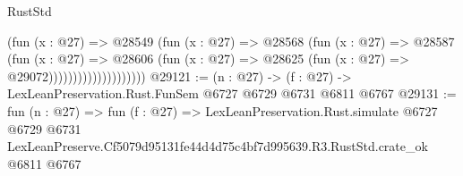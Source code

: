 \begin{lexlean}{RustStd}
\begin{coremodule}
                                (fun (x : @27) =>
                                @28549
                                  (fun (x : @27) =>
                                  @28568
                                    (fun (x : @27) =>
                                    @28587
                                      (fun (x : @27) =>
                                      @28606
                                        (fun (x : @27) =>
                                        @28625 (fun (x : @27) => @29072))))))))))))))))))))
@29121 := (n : @27) -> (f : @27) -> LexLeanPreservation.Rust.FunSem @6727 @6729 @6731 @6811 @6767
@29131 := fun (n : @27) =>
  fun (f : @27) =>
  LexLeanPreservation.Rust.simulate
    @6727
    @6729
    @6731
    LexLeanPreserve.Cf5079d95131fe44d4d75c4bf7d995639.R3.RustStd.crate_ok
    @6811
    @6767
\end{coremodule}
\end{lexlean}
